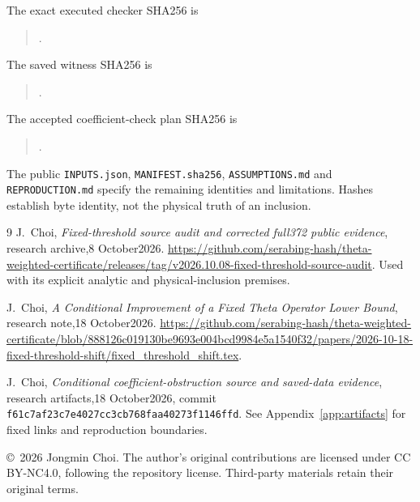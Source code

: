 \documentclass[11pt,a4paper]{article}
\newcommand{\ArtifactCommit}{f61c7af23c7e4027cc3cb768faa40273f1146ffd}
\theoremstyle{definition}
\theoremstyle{remark}
\numberwithin{equation}{section}
\begin{document}
The exact executed checker SHA256 is
\begin{quote}\small{}.\end{quote}
The saved witness SHA256 is
\begin{quote}\small{}.\end{quote}
The accepted coefficient-check plan SHA256 is
\begin{quote}\small{}.\end{quote}
The public \texttt{INPUTS.json}, \texttt{MANIFEST.sha256},
\texttt{ASSUMPTIONS.md} and \texttt{REPRODUCTION.md} specify the remaining
identities and limitations. Hashes establish byte identity, not the
physical truth of an inclusion.

\begin{thebibliography}{9}
J.~Choi,
\emph{Fixed-threshold source audit and corrected full372 public evidence},
research archive,8 October2026.
\url{https://github.com/serabing-hash/theta-weighted-certificate/releases/tag/v2026.10.08-fixed-threshold-source-audit}.
Used with its explicit analytic and physical-inclusion premises.

J.~Choi,
\emph{A Conditional Improvement of a Fixed Theta Operator Lower Bound},
research note,18 October2026.
\url{https://github.com/serabing-hash/theta-weighted-certificate/blob/888126c019130be9693e004bcd9984e5a1540f32/papers/2026-10-18-fixed-threshold-shift/fixed_threshold_shift.tex}.

J.~Choi,
\emph{Conditional coefficient-obstruction source and saved-data evidence},
research artifacts,18 October2026, commit
\texttt{\ArtifactCommit}.
See Appendix~\ref{app:artifacts} for fixed links and reproduction boundaries.
\end{thebibliography}

\medskip\noindent\small
\copyright\ 2026 Jongmin Choi. The author's original contributions are
licensed under CC BY-NC4.0, following the repository license.
Third-party materials retain their original terms.
\end{document}
